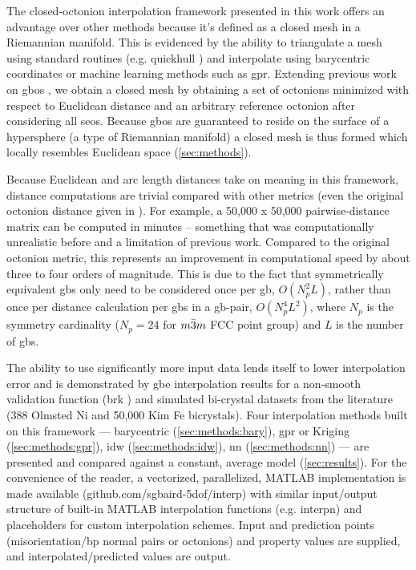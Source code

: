 \documentclass[preprint,12pt]{elsarticle}
\begin{document}
The closed-octonion interpolation framework presented in this work offers an advantage over other methods because it's defined as a closed mesh in a Riemannian manifold. This is evidenced by the ability to triangulate a mesh using standard routines (e.g. quickhull \cite{barberQuickhullAlgorithmConvex1996}) and interpolate using barycentric coordinates or machine learning methods such as \gls{gpr}. Extending previous work on \glspl{gbo} \cite{francisGeodesicOctonionMetric2019,chesserLearningGrainBoundary2020}, we obtain a closed mesh by obtaining a set of octonions minimized with respect to Euclidean distance and an arbitrary reference octonion after considering all \glspl{seo}. Because \glspl{gbo} are guaranteed to reside on the surface of a hypersphere \cite{francisGeodesicOctonionMetric2019} (a type of Riemannian manifold) a closed mesh is thus formed which locally resembles Euclidean space (\ref{sec:methods}).

Because Euclidean and arc length distances take on meaning in this framework, distance computations are trivial compared with other metrics (even the original octonion distance given in \cite{francisGeodesicOctonionMetric2019}). For example, a 50,000 x 50,000 pairwise-distance matrix can be computed in minutes -- something that was computationally unrealistic before and a limitation of previous work. Compared to the original octonion metric, this represents an improvement in computational speed by about three to four orders of magnitude. This is due to the fact that symmetrically equivalent \glspl{gb} only need to be considered once per \gls{gb}, $O(N_p^2L)$, rather than once per distance calculation per \glspl{gb} in a \gls{gb}-pair, $O(N_p^4L^2)$, where $N_p$ is the symmetry cardinality ($N_p=24$ for $m\Bar{3}m$ FCC point group) and $L$ is the number of \glspl{gb}. %

The ability to use significantly more input data lends itself to lower interpolation error and is demonstrated by \gls{gbe} interpolation results for a non-smooth validation function (\gls{brk} \cite{bulatovGrainBoundaryEnergy2014}) and simulated bi-crystal datasets from the literature (388 Olmsted Ni \cite{olmstedSurveyComputedGrain2009} and 50,000 Kim Fe \cite{kimIdentificationSchemeGrain2011} bicrystals). Four interpolation methods built on this framework --- barycentric (\ref{sec:methods:bary}), \gls{gpr} or Kriging (\ref{sec:methods:gpr}), \gls{idw} (\ref{sec:methods:idw}), \gls{nn} (\ref{sec:methods:nn}) --- are presented and compared against a constant, average model (\ref{sec:results}). For the convenience of the reader, a vectorized, parallelized, MATLAB implementation is made available (github.com/sgbaird-5dof/interp) with similar input/output structure of built-in MATLAB interpolation functions (e.g. interpn) and placeholders for custom interpolation schemes. Input and prediction points (misorientation/\gls{bp} normal pairs or octonions) and property values are supplied, and interpolated/predicted values are output.
\end{document}
